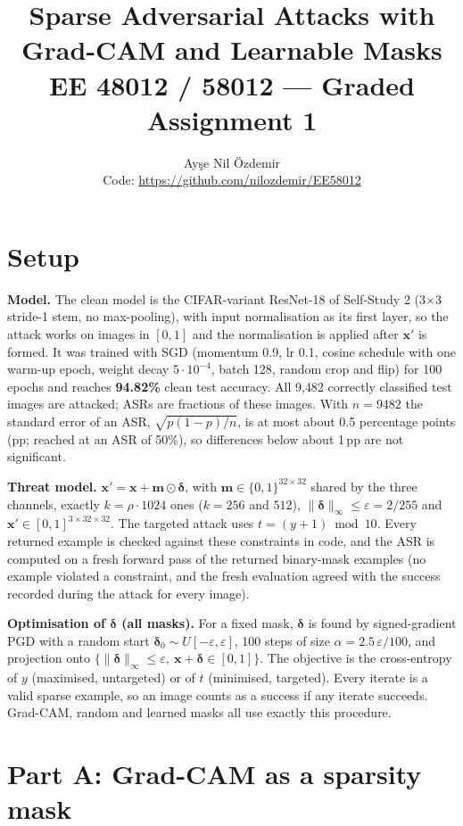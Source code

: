 \documentclass[10pt,a4paper]{article}
\title{\vspace{-1.2cm}\textbf{Sparse Adversarial Attacks with Grad-CAM and Learnable Masks}\\[2pt]
\large EE 48012 / 58012 --- Graded Assignment 1}
\author{Ay\c{s}e Nil \"Ozdemir \quad 38306\\[2pt]
\small Code: \url{https://github.com/nilozdemir/EE58012}}
\date{}
\newcommand{\x}{\mathbf{x}}
\newcommand{\m}{\mathbf{m}}
\newcommand{\dd}{\boldsymbol{\delta}}
\begin{document}
\maketitle
\vspace{-0.8cm}

\section{Setup}

\textbf{Model.} The clean model is the CIFAR-variant ResNet-18 of Self-Study 2
(3$\times$3 stride-1 stem, no max-pooling), with input normalisation as its first
layer, so the attack works on images in $[0,1]$ and the normalisation is applied
after $\x'$ is formed. It was trained with SGD (momentum 0.9, lr 0.1, cosine
schedule with one warm-up epoch, weight decay $5\cdot10^{-4}$, batch 128, random
crop and flip) for 100 epochs and reaches \textbf{94.82\%} clean test accuracy.
All 9{,}482 correctly classified test images are attacked; ASRs are fractions of
these images. With $n=9482$ the standard error of an ASR,
$\sqrt{p(1-p)/n}$, is at most about 0.5 percentage points (pp; reached at an ASR of
50\%), so differences below about 1\,pp are not significant.

\textbf{Threat model.} $\x'=\x+\m\odot\dd$, with $\m\in\{0,1\}^{32\times32}$ shared
by the three channels, exactly $k=\rho\cdot1024$ ones ($k=256$ and $512$),
$\|\dd\|_\infty\le\varepsilon=2/255$ and $\x'\in[0,1]^{3\times32\times32}$. The
targeted attack uses $t=(y+1)\bmod 10$. Every returned example is checked against
these constraints in code, and the ASR is computed on a fresh forward pass of the
returned binary-mask examples (no example violated a constraint, and the fresh
evaluation agreed with the success recorded during the attack for every image).

\textbf{Optimisation of $\dd$ (all masks).} For a fixed mask, $\dd$ is found by
signed-gradient PGD with a random start $\dd_0\sim U[-\varepsilon,\varepsilon]$,
100 steps of size $\alpha=2.5\,\varepsilon/100$, and projection onto
$\{\|\dd\|_\infty\le\varepsilon,\ \x+\dd\in[0,1]\}$. The objective is the
cross-entropy of $y$ (maximised, untargeted) or of $t$ (minimised, targeted). Every
iterate is a valid sparse example, so an image counts as a success if any iterate
succeeds. Grad-CAM, random and learned masks all use exactly this procedure.

\section{Part A: Grad-CAM as a sparsity mask}
\end{document}
